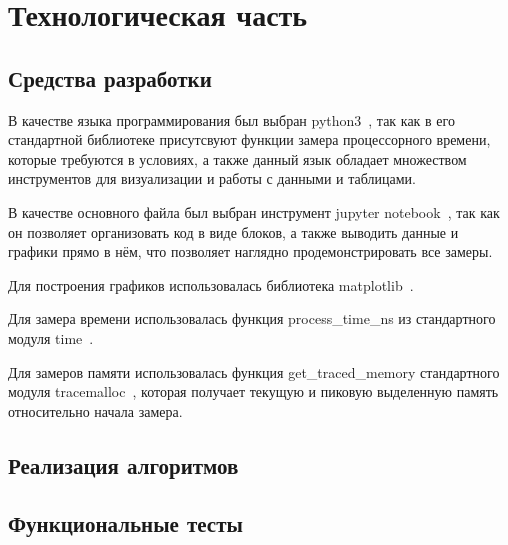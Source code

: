 \chapter{Технологическая часть}
\section{Средства разработки}

В качестве языка программирования был выбран python3~\cite{python3}, так как в его стандартной библиотеке присутсвуют функции замера процессорного времени, которые требуются в условиях, а также данный язык обладает множеством инструментов для визуализации и работы с данными и таблицами.

В качестве основного файла был выбран инструмент jupyter notebook~\cite{python3-jupyter}, так как он позволяет организовать код в виде блоков,  а также выводить данные и графики прямо в нём, что позволяет наглядно продемонстрировать все замеры.

Для построения графиков использовалась библиотека matplotlib~\cite{python3-matplotlib}.

Для замера времени использовалась функция process\_time\_ns из стандартного модуля time~\cite{python3-time}.

Для замеров памяти использовалась функция get\_traced\_memory стандартного модуля tracemalloc~\cite{tracemalloc}, которая получает текущую и пиковую выделенную память относительно начала замера.

\section{Реализация алгоритмов}









\section{Функциональные тесты}

